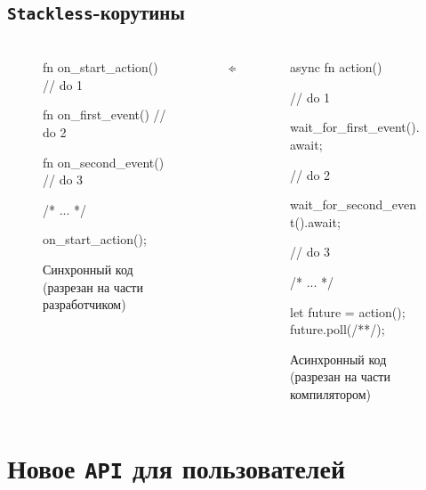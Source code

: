 \documentclass[t]{beamer}  %
\begin{document}
\subsection{\texttt{Stackless}-корутины}
 \begin{frame}[fragile]
	\frametitle{\insertsection} 
	\framesubtitle{\insertsubsection}
	\vspace{-0.7cm}
	\begin{columns}
		\begin{column}[c]{0.40\linewidth}
			\vspace{0.5cm}
			\begin{figure}
				\centering
				\scriptsize
				\begin{rustcode}
fn on_start_action() {
  // do 1
}

fn on_first_event() {
  // do 2
}

fn on_second_event() {
  // do 3
}

/* ... */

on_start_action();
			\end{rustcode}
				\caption*{Синхронный код (разрезан на части разработчиком)}
			\end{figure}
		\end{column}
		\begin{column}[c]{0.05\linewidth}
			\vspace{-1cm}
			$\iff$
		\end{column}
		\begin{column}[c]{0.55\linewidth}
			\vspace{0.3cm}
			\begin{figure}
				\centering
				\scriptsize
				\begin{rustcode}
async fn action() {
  // do 1

  wait_for_first_event().await;

  // do 2 

  wait_for_second_event().await;

  // do 3
}

/* ... */

let future = action();
future.poll(/**/);
			\end{rustcode}
				\caption*{Асинхронный код (разрезан на части компилятором)}
			\end{figure}
		\end{column}
	\end{columns}
 \end{frame}

 \section{Новое \texttt{API} для пользователей}
\end{document}
